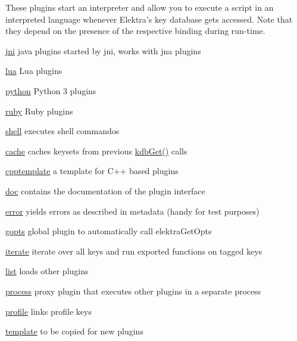 These plugins start an interpreter and allow you to execute a script in an interpreted language whenever Elektra’s key database gets accessed. Note that they depend on the presence of the respective binding during run-\/time.


\begin{DoxyItemize}
\item \hyperlink{autotoc_md338_src_plugins_jni_README_md}{jni} java plugins started by jni, works with jna plugins
\item \hyperlink{autotoc_md392_src_plugins_lua_README_md}{lua} Lua plugins
\item \hyperlink{autotoc_md540_src_plugins_python_README_md}{python} Python 3 plugins
\item \hyperlink{autotoc_md632_src_plugins_ruby_README_md}{ruby} Ruby plugins
\item \hyperlink{autotoc_md637_src_plugins_shell_README_md}{shell} executes shell commandos
\end{DoxyItemize}


\begin{DoxyItemize}
\item \hyperlink{autotoc_md71_src_plugins_cache_README_md}{cache} caches keysets from previous {\ttfamily \hyperlink{group__kdb_ga28e385fd9cb7ccfe0b2f1ed2f62453a1}{kdb\+Get()}} calls
\item \hyperlink{autotoc_md108_src_plugins_cpptemplate_README_md}{cpptemplate} a template for C++ based plugins
\item \hyperlink{autotoc_md191_src_plugins_doc_README_md}{doc} contains the documentation of the plugin interface
\item \hyperlink{autotoc_md198_src_plugins_error_README_md}{error} yields errors as described in metadata (handy for test purposes)
\item \hyperlink{autotoc_md243_src_plugins_gopts_README_md}{gopts} global plugin to automatically call {\ttfamily elektra\+Get\+Opts}
\item \hyperlink{autotoc_md337_src_plugins_iterate_README_md}{iterate} iterate over all keys and run exported functions on tagged keys
\item \hyperlink{autotoc_md386_src_plugins_list_README_md}{list} loads other plugins
\item \hyperlink{autotoc_md531_src_plugins_process_README_md}{process} proxy plugin that executes other plugins in a separate process
\item \hyperlink{autotoc_md538_src_plugins_profile_README_md}{profile} links profile keys
\item \hyperlink{autotoc_md685_src_plugins_template_README_md}{template} to be copied for new plugins 
\end{DoxyItemize}